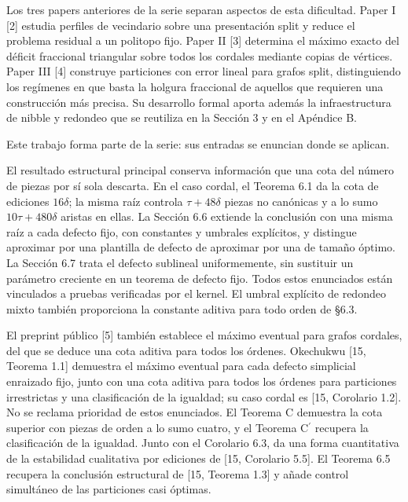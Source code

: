 \documentclass[spanish,11pt,a4paper]{article}
\begin{document}
Los tres papers anteriores de la serie separan aspectos de esta dificultad. Paper I {[}2{]} estudia perfiles de vecindario sobre una presentación split y reduce el problema residual a un politopo fijo. Paper II {[}3{]} determina el máximo exacto del déficit fraccional triangular sobre todos los cordales mediante copias de vértices. Paper III {[}4{]} construye particiones con error lineal para grafos split, distinguiendo los regímenes en que basta la holgura fraccional de aquellos que requieren una construcción más precisa. Su desarrollo formal aporta además la infraestructura de nibble y redondeo que se reutiliza en la Sección 3 y en el Apéndice B.

Este trabajo forma parte de la serie: sus entradas se enuncian donde se aplican.

El resultado estructural principal conserva información que una cota del número de piezas por sí sola descarta. En el caso cordal, el Teorema 6.1 da la cota de ediciones \(16\delta\); la misma raíz controla \(\tau+48\delta\) piezas no canónicas y a lo sumo \(10\tau+480\delta\) aristas en ellas. La Sección 6.6 extiende la conclusión con una misma raíz a cada defecto fijo, con constantes y umbrales explícitos, y distingue aproximar por una plantilla de defecto de aproximar por una de tamaño óptimo. La Sección 6.7 trata el defecto sublineal uniformemente, sin sustituir un parámetro creciente en un teorema de defecto fijo. Todos estos enunciados están vinculados a pruebas verificadas por el kernel. El umbral explícito de redondeo mixto también proporciona la constante aditiva para todo orden de §6.3.

El preprint público {[}5{]} también establece el máximo eventual para grafos cordales, del que se deduce una cota aditiva para todos los órdenes. Okechukwu {[}15, Teorema 1.1{]} demuestra el máximo eventual para cada defecto simplicial enraizado fijo, junto con una cota aditiva para todos los órdenes para particiones irrestrictas y una clasificación de la igualdad; su caso cordal es {[}15, Corolario 1.2{]}. No se reclama prioridad de estos enunciados. El Teorema C demuestra la cota superior con piezas de orden a lo sumo cuatro, y el Teorema \texorpdfstring{C\ensuremath{^{\prime}}}{C'} recupera la clasificación de la igualdad. Junto con el Corolario 6.3, da una forma cuantitativa de la estabilidad cualitativa por ediciones de {[}15, Corolario 5.5{]}. El Teorema 6.5 recupera la conclusión estructural de {[}15, Teorema 1.3{]} y añade control simultáneo de las particiones casi óptimas.
\end{document}
